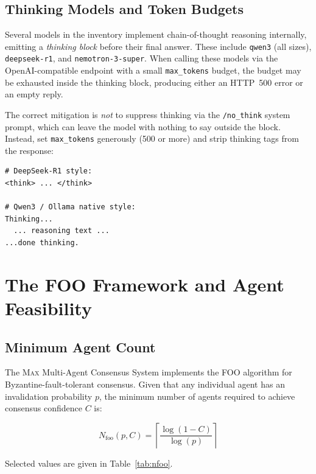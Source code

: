 \subsection{Thinking Models and Token Budgets}

Several models in the inventory implement chain-of-thought reasoning
internally, emitting a \emph{thinking block} before their final answer.
These include \texttt{qwen3} (all sizes), \texttt{deepseek-r1}, and
\texttt{nemotron-3-super}. When calling these models via the
OpenAI-compatible endpoint with a small \texttt{max\_tokens} budget, the
budget may be exhausted inside the thinking block, producing either an
HTTP~500 error or an empty reply.

The correct mitigation is \emph{not} to suppress thinking via the
\texttt{/no\_think} system prompt, which can leave the model with nothing
to say outside the block. Instead, set \texttt{max\_tokens} generously
(500 or more) and strip thinking tags from the response:

\begin{lstlisting}[style=bashstyle, caption={Thinking tag patterns to strip from model output}]
# DeepSeek-R1 style:
<think> ... </think>

# Qwen3 / Ollama native style:
Thinking...
  ... reasoning text ...
...done thinking.
\end{lstlisting}

\section{The FOO Framework and Agent Feasibility}
\label{sec:foo}

\subsection{Minimum Agent Count}

The \textsc{Max} Multi-Agent Consensus System implements the FOO
algorithm for Byzantine-fault-tolerant consensus. Given that any
individual agent has an invalidation probability $p$, the minimum number
of agents required to achieve consensus confidence $C$ is:

\begin{equation}
N_{\text{foo}}(p, C)
  = \left\lceil \frac{\log(1 - C)}{\log(p)} \right\rceil
\label{eq:nfoo}
\end{equation}

Selected values are given in Table~\ref{tab:nfoo}.

